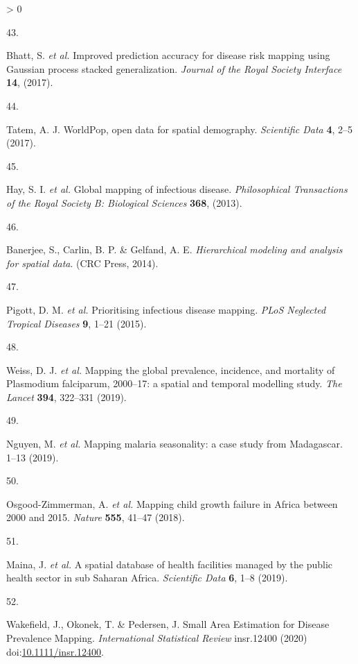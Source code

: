\documentclass[
]{article}
\newlength{\cslhangindent}
\newlength{\csllabelwidth}
\newenvironment{CSLReferences}[2] %
 {%
  \setlength{\parindent}{0pt}
  \ifodd #1 \everypar{\setlength{\hangindent}{\cslhangindent}}\ignorespaces\fi
  \ifnum #2 > 0
  \setlength{\parskip}{#2\baselineskip}
  \fi
 }%
 {}
\newcommand{\CSLLeftMargin}[1]{\parbox[t]{\csllabelwidth}{#1}}
\newcommand{\CSLRightInline}[1]{\parbox[t]{\linewidth - \csllabelwidth}{#1}\break}
\begin{document}
\begin{CSLReferences}{0}{0}
\leavevmode\hypertarget{ref-Bhatt2017}{}%
\CSLLeftMargin{43. }
\CSLRightInline{Bhatt, S. \emph{et al.} {Improved prediction accuracy for disease risk mapping using Gaussian process stacked generalization}. \emph{Journal of the Royal Society Interface} \textbf{14}, (2017).}

\leavevmode\hypertarget{ref-Tatem2017}{}%
\CSLLeftMargin{44. }
\CSLRightInline{Tatem, A. J. {WorldPop, open data for spatial demography}. \emph{Scientific Data} \textbf{4}, 2--5 (2017).}

\leavevmode\hypertarget{ref-Hay2013}{}%
\CSLLeftMargin{45. }
\CSLRightInline{Hay, S. I. \emph{et al.} {Global mapping of infectious disease}. \emph{Philosophical Transactions of the Royal Society B: Biological Sciences} \textbf{368}, (2013).}

\leavevmode\hypertarget{ref-Banerjee2014}{}%
\CSLLeftMargin{46. }
\CSLRightInline{Banerjee, S., Carlin, B. P. \& Gelfand, A. E. \emph{{Hierarchical modeling and analysis for spatial data}}. (CRC Press, 2014).}

\leavevmode\hypertarget{ref-Pigott2015}{}%
\CSLLeftMargin{47. }
\CSLRightInline{Pigott, D. M. \emph{et al.} {Prioritising infectious disease mapping}. \emph{PLoS Neglected Tropical Diseases} \textbf{9}, 1--21 (2015).}

\leavevmode\hypertarget{ref-Weiss2019}{}%
\CSLLeftMargin{48. }
\CSLRightInline{Weiss, D. J. \emph{et al.} {Mapping the global prevalence, incidence, and mortality of Plasmodium falciparum, 2000--17: a spatial and temporal modelling study}. \emph{The Lancet} \textbf{394}, 322--331 (2019).}

\leavevmode\hypertarget{ref-Nguyen2019}{}%
\CSLLeftMargin{49. }
\CSLRightInline{Nguyen, M. \emph{et al.} {Mapping malaria seasonality: a case study from Madagascar}. 1--13 (2019).}

\leavevmode\hypertarget{ref-Osgood-Zimmerman2018}{}%
\CSLLeftMargin{50. }
\CSLRightInline{Osgood-Zimmerman, A. \emph{et al.} {Mapping child growth failure in Africa between 2000 and 2015}. \emph{Nature} \textbf{555}, 41--47 (2018).}

\leavevmode\hypertarget{ref-Maina2019}{}%
\CSLLeftMargin{51. }
\CSLRightInline{Maina, J. \emph{et al.} {A spatial database of health facilities managed by the public health sector in sub Saharan Africa}. \emph{Scientific Data} \textbf{6}, 1--8 (2019).}

\leavevmode\hypertarget{ref-Wakefield2020}{}%
\CSLLeftMargin{52. }
\CSLRightInline{Wakefield, J., Okonek, T. \& Pedersen, J. {Small Area Estimation for Disease Prevalence Mapping}. \emph{International Statistical Review} insr.12400 (2020) doi:\href{https://doi.org/10.1111/insr.12400}{10.1111/insr.12400}.}


\end{CSLReferences}
\end{document}
